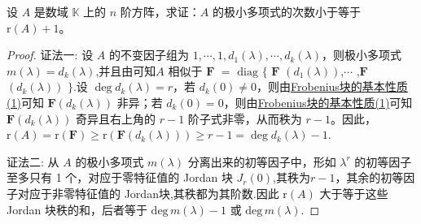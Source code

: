 \documentclass[../../main.tex]{subfiles}%
\begin{document}
\begin{proposition}\label{proposition:极小多项式的次数小于等于矩阵的秩加1}
设 $A$ 是数域 $\mathbb{K}$ 上的 $n$ 阶方阵，求证：$A$ 的极小多项式的次数小于等于 $\mathrm{r}(A)+1$。
\end{proposition}
\begin{proof}

{\color{blue}证法一:}
设 $A$ 的不变因子组为 $1,\cdots,1,d_1(\lambda),\cdots,d_k(\lambda)$，则极小多项式 $m(\lambda)=d_k(\lambda)$,并且由可知$A$ 相似于 $\boldsymbol{F}$ $=$ $\mathrm{diag}$ $\{$ $\boldsymbol{F}$ $(d_1(\lambda))$,$\cdots$ ,$\boldsymbol{F}$ $(d_k(\lambda))$ $\}$.设 $\deg d_k(\lambda)=r$，若 $d_k(0)\neq 0$，则由\hyperref[lemma:Frobenius标准型矩阵的极小多项式和不变因子]{Frobenius块的基本性质(1)}可知 $\boldsymbol{F}(d_k(\lambda))$ 非异；若 $d_k(0)=0$，则由\hyperref[lemma:Frobenius标准型矩阵的极小多项式和不变因子]{Frobenius块的基本性质(1)}可知 $\boldsymbol{F}(d_k(\lambda))$ 奇异且右上角的 $r - 1$ 阶子式非零，从而秩为 $r - 1$。因此，$\mathrm{r}(A)=\mathrm{r}(\boldsymbol{F})\geqslant \mathrm{r}(\boldsymbol{F}(d_k(\lambda)))\geqslant  r - 1=\deg d_k(\lambda)-1$.

{\color{blue}证法二:}
从 $A$ 的极小多项式 $m(\lambda)$ 分离出来的初等因子中，形如 $\lambda^r$ 的初等因子至多只有 1 个，对应于零特征值的 Jordan 块 $J_r(0)$,其秩为$r-1$，其余的初等因子对应于非零特征值的 Jordan块,其秩都为其阶数.因此 $\mathrm{r}(A)$ 大于等于这些 Jordan 块秩的和，后者等于 $\mathrm{deg}\,m(\lambda) - 1$ 或 $\mathrm{deg}\,m(\lambda)$.
\end{proof}
\end{document}
